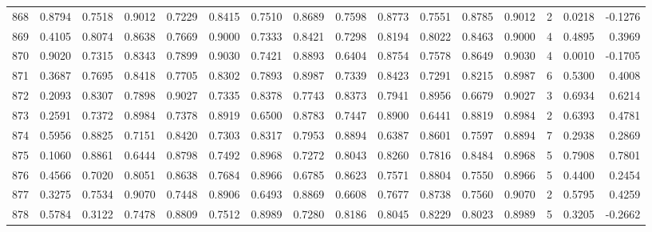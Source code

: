 \begin{tabular}{lrrrrrrrrrrrrrrr}
868 &      0.8794 &  0.7518 &  0.9012 &  0.7229 &  0.8415 &  0.7510 &  0.8689 &  0.7598 &  0.8773 &  0.7551 &   0.8785 &     0.9012 &      2 &                    0.0218 &                    -0.1276 \\
869 &      0.4105 &  0.8074 &  0.8638 &  0.7669 &  0.9000 &  0.7333 &  0.8421 &  0.7298 &  0.8194 &  0.8022 &   0.8463 &     0.9000 &      4 &                    0.4895 &                     0.3969 \\
870 &      0.9020 &  0.7315 &  0.8343 &  0.7899 &  0.9030 &  0.7421 &  0.8893 &  0.6404 &  0.8754 &  0.7578 &   0.8649 &     0.9030 &      4 &                    0.0010 &                    -0.1705 \\
871 &      0.3687 &  0.7695 &  0.8418 &  0.7705 &  0.8302 &  0.7893 &  0.8987 &  0.7339 &  0.8423 &  0.7291 &   0.8215 &     0.8987 &      6 &                    0.5300 &                     0.4008 \\
872 &      0.2093 &  0.8307 &  0.7898 &  0.9027 &  0.7335 &  0.8378 &  0.7743 &  0.8373 &  0.7941 &  0.8956 &   0.6679 &     0.9027 &      3 &                    0.6934 &                     0.6214 \\
873 &      0.2591 &  0.7372 &  0.8984 &  0.7378 &  0.8919 &  0.6500 &  0.8783 &  0.7447 &  0.8900 &  0.6441 &   0.8819 &     0.8984 &      2 &                    0.6393 &                     0.4781 \\
874 &      0.5956 &  0.8825 &  0.7151 &  0.8420 &  0.7303 &  0.8317 &  0.7953 &  0.8894 &  0.6387 &  0.8601 &   0.7597 &     0.8894 &      7 &                    0.2938 &                     0.2869 \\
875 &      0.1060 &  0.8861 &  0.6444 &  0.8798 &  0.7492 &  0.8968 &  0.7272 &  0.8043 &  0.8260 &  0.7816 &   0.8484 &     0.8968 &      5 &                    0.7908 &                     0.7801 \\
876 &      0.4566 &  0.7020 &  0.8051 &  0.8638 &  0.7684 &  0.8966 &  0.6785 &  0.8623 &  0.7571 &  0.8804 &   0.7550 &     0.8966 &      5 &                    0.4400 &                     0.2454 \\
877 &      0.3275 &  0.7534 &  0.9070 &  0.7448 &  0.8906 &  0.6493 &  0.8869 &  0.6608 &  0.7677 &  0.8738 &   0.7560 &     0.9070 &      2 &                    0.5795 &                     0.4259 \\
878 &      0.5784 &  0.3122 &  0.7478 &  0.8809 &  0.7512 &  0.8989 &  0.7280 &  0.8186 &  0.8045 &  0.8229 &   0.8023 &     0.8989 &      5 &                    0.3205 &                    -0.2662 \\

\end{tabular}
